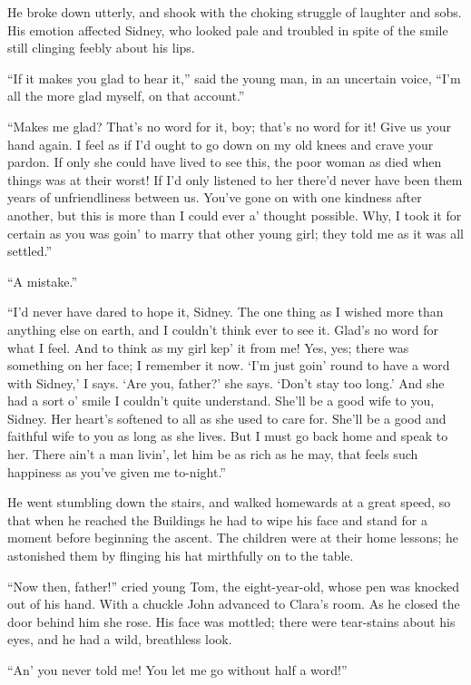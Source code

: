 He broke down utterly, and shook with the choking struggle of laughter
and sobs. His emotion affected Sidney, who looked pale and troubled in
spite of the smile still clinging feebly about his lips.

``If it makes you glad to hear it,'' said the young man, in an uncertain
voice, ``I'm all the more glad myself, on that account.''

``Makes me glad? That's no word for it, boy; that's no word for it! Give
us your hand again. I feel as if I'd ought to go down on my old knees
and crave your pardon. If {}only she could have lived to see this, the
poor woman as died when things was at their worst! If I'd only listened
to her there'd never have been them years of unfriendliness between us.
You've gone on with one kindness after another, but this is more than I
could ever a' thought possible. Why, I took it for certain as you was
goin' to marry that other young girl; they told me as it was all
settled.''

``A mistake.''

``I'd never have dared to hope it, Sidney. The one thing as I wished
more than anything else on earth, and I couldn't think ever to see it.
Glad's no word for what I feel. And to think as my girl kep' it from me!
Yes, yes; there was something on her face; I remember it now. `I'm just
goin' round to have a word with Sidney,' I says. `Are you, father?' she
says. `Don't stay too long.' And she had a sort o' smile I couldn't
quite understand. She'll be a good wife to you, Sidney. Her heart's
softened to all as she used to care for. She'll be a good and faithful
wife to you as long as she lives. But I must go back home and speak to
her. There ain't a man {}livin', let him be as rich as he may, that
feels such happiness as you've given me to-night.''

He went stumbling down the stairs, and walked homewards at a great
speed, so that when he reached the Buildings he had to wipe his face and
stand for a moment before beginning the ascent. The children were at
their home lessons; he astonished them by flinging his hat mirthfully on
to the table.

``Now then, father!'' cried young Tom, the eight-year-old, whose pen was
knocked out of his hand. With a chuckle John advanced to Clara's room.
As he closed the door behind him she rose. His face was mottled; there
were tear-stains about his eyes, and he had a wild, breathless look.

``An' you never told me! You let me go without half a word!''

